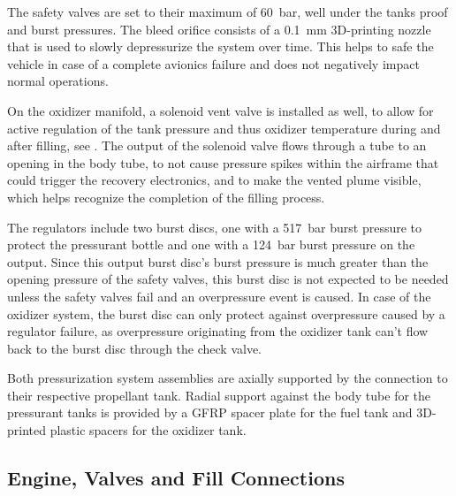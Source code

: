 The safety valves are set to their maximum of \SI{60}{\bar}, well under the tanks proof and burst pressures. The bleed orifice consists of a \SI{0.1}{\milli\meter} 3D-printing nozzle that is used to slowly depressurize the system over time. This helps to safe the vehicle in case of a complete avionics failure and does not negatively impact normal operations. 

On the oxidizer manifold, a solenoid vent valve is installed as well, to allow for active regulation of the tank pressure and thus oxidizer temperature during and after filling, see . The output of the solenoid valve flows through a tube to an opening in the body tube, to not cause pressure spikes within the airframe that could trigger the recovery electronics, and to make the vented plume visible, which helps recognize the completion of the filling process.

The regulators include two burst discs, one with a \SI{517}{\bar} burst pressure to protect the pressurant bottle and one with a \SI{124}{\bar} burst pressure on the output. Since this output burst disc's burst pressure is much greater than the opening pressure of the safety valves, this burst disc is not expected to be needed unless the safety valves fail and an overpressure event is caused. In case of the oxidizer system, the burst disc can only protect against overpressure caused by a regulator failure, as overpressure originating from the oxidizer tank can't flow back to the burst disc through the check valve.

Both pressurization system assemblies are axially supported by the connection to their respective propellant tank. Radial support against the body tube for the pressurant tanks is provided by a GFRP spacer plate for the fuel tank and 3D-printed plastic spacers for the oxidizer tank.

\subsection{Engine, Valves and Fill Connections}
\label{sec:engine_valves_fill_connections}

